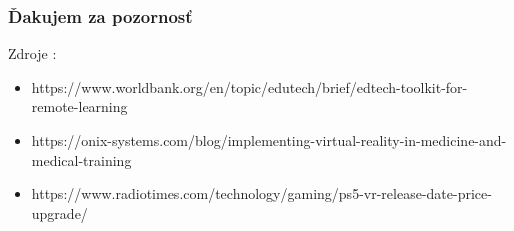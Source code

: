 \documentclass{beamer}
\begin{document}
\begin{frame}[fragile=singleslide]\frametitle{Ďakujem za pozornosť}
Zdroje :


\begin{itemize}
\item https://www.worldbank.org/en/topic/edutech/brief/edtech-toolkit-for-remote-learning
\item https://onix-systems.com/blog/implementing-virtual-reality-in-medicine-and-medical-training
\item https://www.radiotimes.com/technology/gaming/ps5-vr-release-date-price-upgrade/
\end{itemize}
\end{frame}
\end{document}
